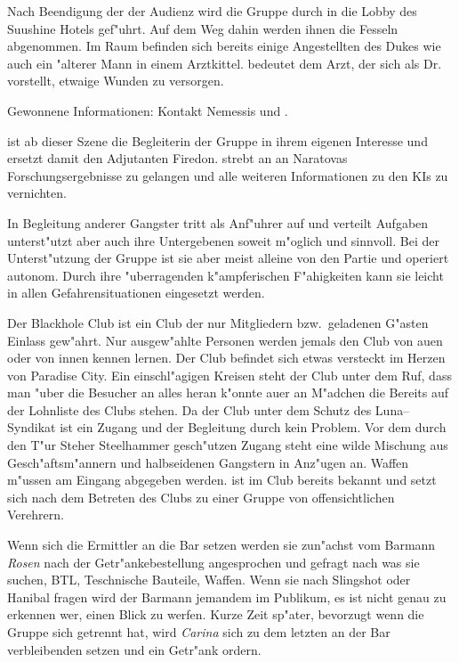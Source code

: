 Nach Beendigung der der Audienz wird die Gruppe durch \xlsn{} in die Lobby des Suushine Hotels gef"uhrt. Auf dem Weg dahin werden ihnen die Fesseln abgenommen. Im Raum befinden sich bereits einige Angestellten des Dukes wie auch ein "alterer Mann in einem Arztkittel. \xlsn{} bedeutet dem Arzt, der sich als Dr.~  vorstellt, etwaige Wunden zu versorgen.

\begin{remarks}
	Gewonnene Informationen: Kontakt Nemessis und \xl{}.

	\xl{} ist ab dieser Szene die Begleiterin der Gruppe in ihrem eigenen Interesse und ersetzt damit den Adjutanten Firedon. \xl{} strebt an an Naratovas Forschungsergebnisse zu gelangen und alle weiteren Informationen zu den KIs zu vernichten.

	In Begleitung anderer Gangster tritt \xl{} als Anf"uhrer auf und verteilt Aufgaben unterst"utzt aber auch ihre Untergebenen soweit m"oglich und sinnvoll. Bei der Unterst"utzung der Gruppe ist sie aber meist alleine von den Partie und operiert autonom. Durch ihre "uberragenden k"ampferischen F"ahigkeiten kann sie leicht in allen Gefahrensituationen eingesetzt werden.
\end{remarks}



Der Blackhole Club ist ein Club der nur Mitgliedern bzw.~geladenen G"asten Einlass gew"ahrt. Nur ausgew"ahlte Personen werden jemals den Club von au\3en oder von innen kennen lernen. Der Club befindet sich etwas versteckt im Herzen von Paradise City. Ein einschl"agigen Kreisen steht der Club unter dem Ruf, dass man "uber die Besucher an alles heran k"onnte au\3er an M"adchen die Bereits auf der Lohnliste des Clubs stehen. Da der Club unter dem Schutz des Luna--Syndikat ist ein Zugang und der Begleitung durch \xl{} kein Problem. Vor dem durch den T"ur Steher Steelhammer gesch"utzen Zugang steht eine wilde Mischung aus Gesch"aftsm"annern und halbseidenen Gangstern in Anz"ugen an. Waffen m"ussen am Eingang abgegeben werden. \xl{} ist im Club bereits bekannt und setzt sich nach dem Betreten des Clubs zu einer Gruppe von offensichtlichen Verehrern.

Wenn sich die Ermittler an die Bar setzen werden sie zun"achst vom Barmann \emph{Rosen} nach der Getr"ankebestellung angesprochen und gefragt nach was sie suchen, BTL, Teschnische Bauteile, Waffen. Wenn sie nach Slingshot oder Hanibal fragen wird der Barmann jemandem im Publikum, es ist nicht genau zu erkennen wer, einen Blick zu werfen. Kurze Zeit sp"ater, bevorzugt wenn die Gruppe sich getrennt hat, wird \emph{Carina} sich zu dem letzten an der Bar verbleibenden setzen und ein Getr"ank ordern.

